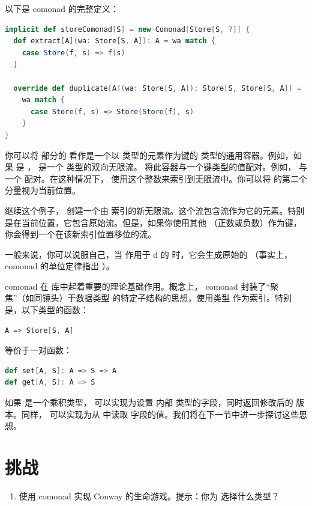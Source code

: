 以下是  comonad 的完整定义：

\begin{lstlisting}[language=Scala]
implicit def storeComonad[S] = new Comonad[Store[S, ?]] {
  def extract[A](wa: Store[S, A]): A = wa match {
    case Store(f, s) => f(s)
  }

  override def duplicate[A](wa: Store[S, A]): Store[S, Store[S, A]] =
    wa match {
      case Store(f, s) => Store(Store(f), s)
    }
}
\end{lstlisting}
你可以将  部分的  看作是一个以  类型的元素作为键的  类型的通用容器。例如，如果  是 ， 是一个  类型的双向无限流。 将此容器与一个键类型的值配对。例如， 与一个  配对。在这种情况下， 使用这个整数来索引到无限流中。你可以将  的第二个分量视为当前位置。

继续这个例子， 创建一个由  索引的新无限流。这个流包含流作为它的元素。特别是在当前位置，它包含原始流。但是，如果你使用其他 （正数或负数）作为键，你会得到一个在该新索引位置移位的流。

一般来说，你可以说服自己，当  作用于 d 的  时，它会生成原始的 （事实上，comonad 的单位定律指出 ）。

 comonad 在  库中起着重要的理论基础作用。概念上， comonad 封装了“聚焦”（如同镜头）于数据类型  的特定子结构的思想，使用类型  作为索引。特别是，以下类型的函数：

\begin{lstlisting}[language=Scala]
A => Store[S, A]
\end{lstlisting}
等价于一对函数：

\begin{lstlisting}[language=Scala]
def set[A, S]: A => S => A
def get[A, S]: A => S
\end{lstlisting}
如果  是一个乘积类型， 可以实现为设置  内部  类型的字段，同时返回修改后的  版本。同样， 可以实现为从  中读取  字段的值。我们将在下一节中进一步探讨这些思想。

\section{挑战}

\begin{enumerate}
  \tightlist
  \item
  使用  comonad 实现 Conway 的生命游戏。提示：你为  选择什么类型？
\end{enumerate}

